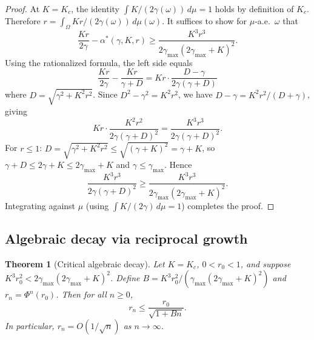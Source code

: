 \documentclass[12pt]{article}
\newtheorem{theorem}{Theorem}[section]
\theoremstyle{definition}
\begin{document}
\begin{proof}
At $K = K_c$, the identity $\int K/(2\gamma(\omega))\,d\mu = 1$ holds
by definition of $K_c$.  Therefore
$r = \int_\Omega Kr/(2\gamma(\omega))\,d\mu(\omega)$.
It suffices to show for $\mu$-a.e.\ $\omega$ that
\[
\frac{Kr}{2\gamma} - \alpha^*(\gamma,K,r) \ge \frac{K^3 r^3}{2\gamma_{\max}(2\gamma_{\max}+K)^2}.
\]
Using the rationalized formula, the left side equals
\[
\frac{Kr}{2\gamma} - \frac{Kr}{\gamma + D} = Kr\cdot\frac{D - \gamma}{2\gamma(\gamma + D)}
\]
where $D = \sqrt{\gamma^2 + K^2 r^2}$.  Since $D^2 - \gamma^2 = K^2r^2$, we have
$D - \gamma = K^2r^2/(D + \gamma)$, giving
\[
Kr \cdot \frac{K^2r^2}{2\gamma(\gamma+D)^2} = \frac{K^3 r^3}{2\gamma(\gamma+D)^2}.
\]
For $r \le 1$: $D = \sqrt{\gamma^2 + K^2r^2} \le \sqrt{(\gamma+K)^2} = \gamma + K$, so
$\gamma + D \le 2\gamma + K \le 2\gamma_{\max} + K$ and $\gamma \le \gamma_{\max}$.  Hence
\[
\frac{K^3 r^3}{2\gamma(\gamma+D)^2} \ge \frac{K^3 r^3}{2\gamma_{\max}(2\gamma_{\max}+K)^2}.
\]
Integrating against $\mu$ (using $\int K/(2\gamma)\,d\mu = 1$) completes the proof.
\end{proof}

\subsection{Algebraic decay via reciprocal growth}

\begin{theorem}[Critical algebraic decay]\label{thm:algebraic}
Let $K = K_c$, $0 < r_0 < 1$, and suppose
$K^3 r_0^2 < 2\gamma_{\max}(2\gamma_{\max}+K)^2$.
Define $B = K^3 r_0^2/(\gamma_{\max}(2\gamma_{\max}+K)^2)$ and
$r_n = \Phi^n(r_0)$.  Then for all $n \ge 0$,
\begin{equation}\label{eq:algebraic_decay}
r_n \le \frac{r_0}{\sqrt{1 + Bn}}.
\end{equation}
In particular, $r_n = O(1/\sqrt{n})$ as $n \to \infty$.
\end{theorem}
\end{document}
